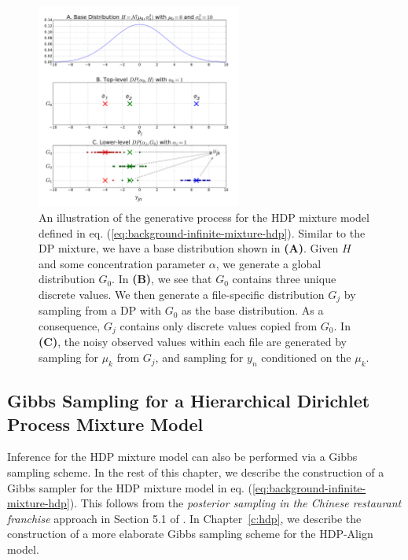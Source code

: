 \begin{figure}
\noindent \begin{centering}
\includegraphics[width=0.6\textwidth]{03-machine-learning/figures/hdp_samples.pdf}
\par\end{centering}
\caption[An illustration of the generative process for the HDP mixture model defined in eq. (\ref{eq:background-infinite-mixture-hdp}).]{\label{fig:g-from-hdp}An illustration of the generative process for the HDP mixture model defined in eq. (\ref{eq:background-infinite-mixture-hdp}). Similar to the DP mixture, we have a base distribution shown in \textbf{(A)}. Given $H$ and some concentration parameter $\alpha$, we generate a global distribution $G_0$. In \textbf{(B)}, we see that $G_0$ contains three unique discrete values. We then generate a file-specific distribution $G_j$ by sampling from a DP with $G_0$ as the base distribution. As a consequence, $G_j$ contains only discrete values copied from $G_0$. In \textbf{(C)}, the noisy observed values within each file are generated by sampling for $\mu_k$ from $G_j$, and sampling for $y_n$ conditioned on the $\mu_k$.}
\end{figure}

\subsection{Gibbs Sampling for a Hierarchical Dirichlet Process Mixture Model}

Inference for the HDP mixture model can also be performed via a Gibbs sampling scheme. In the rest of this chapter, we describe the construction of a Gibbs sampler for the HDP mixture model in eq. (\ref{eq:background-infinite-mixture-hdp}). This follows from the \emph{posterior sampling in the Chinese restaurant franchise} approach in Section 5.1 of \cite{teh2012hierarchical}. In Chapter~\ref{c:hdp}, we describe the construction of a more elaborate Gibbs sampling scheme for the HDP-Align model.

